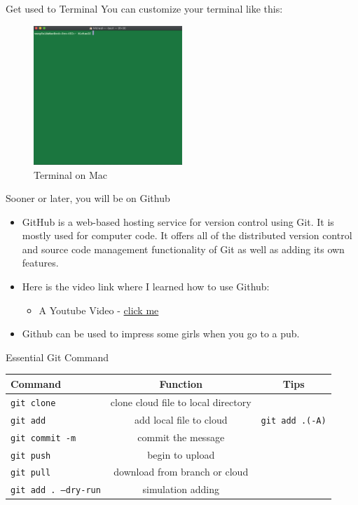 \documentclass[handout]{beamer} %
\begin{document}
\begin{frame}{Get used to Terminal}
	You can customize your terminal like this:
	\begin{figure}[H]
		\centering
		\includegraphics[width = 0.5\textwidth]{Pictures/terminal2}
		\caption{Terminal on Mac}
	\end{figure}
\end{frame}

\begin{frame}{Sooner or later, you will be on Github}
\begin{itemize}
\setlength\itemsep{1em} 
	\item GitHub is a web-based hosting service for version control using Git. It is mostly used for computer code. It offers all of the distributed version control and source code management functionality of Git as well as adding its own features.
	\item Here is the video link where I learned how to use Github: \begin{itemize} 
	\item A Youtube Video - \href{https://www.youtube.com/watch?v=0fKg7e37bQE&fbclid=IwAR3qiy3lyLxkwiE_6recElswiRJsknhFnnhjK5M4OMNkzBbI2aco01fJBOo}{click me \Coffeecup }
	\end{itemize}
	\item Github can be used to impress some girls when you go to a pub. 
\end{itemize}
\end{frame}

\begin{frame}{Essential Git Command}
\footnotesize
\begin{table}[H]
	\centering
	\begin{tabular}{lcc}
	\hline 
	\hline 
		Command & Function & Tips \\
		\hline 
		\texttt{git clone} & clone cloud file to local directory & \\
		\texttt{git add} & add local file to cloud & \texttt{git add .(-A)} \\
		\texttt{git commit -m} & commit the message & \\
		\texttt{git push} & begin to upload & \\
		\texttt{git pull} & download from branch or cloud &\\ 
		\texttt{git add . --dry-run} & simulation adding & \\
		\hline  
	\end{tabular}
\end{table}
	
\end{frame}
\end{document}

